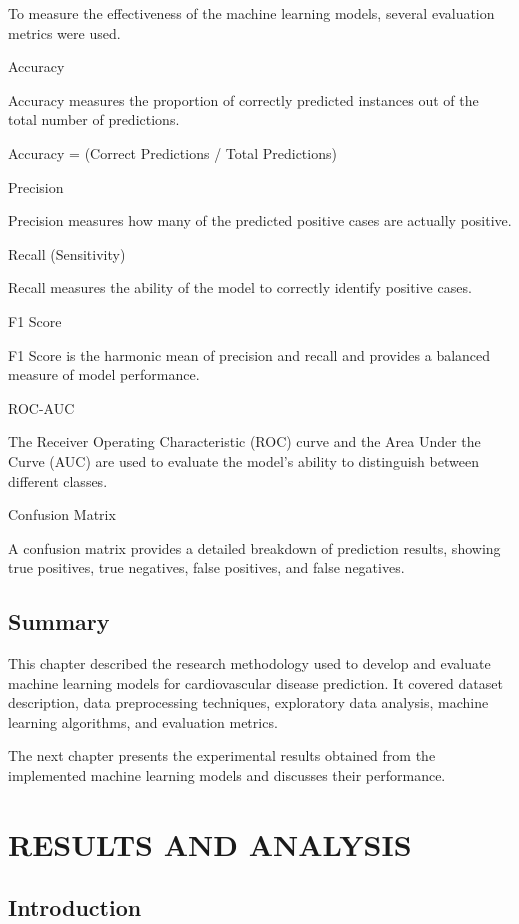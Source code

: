 To measure the effectiveness of the machine learning models, several evaluation metrics were used.

Accuracy

Accuracy measures the proportion of correctly predicted instances out of the total number of predictions.

Accuracy = (Correct Predictions / Total Predictions)

Precision

Precision measures how many of the predicted positive cases are actually positive.

Recall (Sensitivity)

Recall measures the ability of the model to correctly identify positive cases.

F1 Score

F1 Score is the harmonic mean of precision and recall and provides a balanced measure of model performance.

ROC-AUC

The Receiver Operating Characteristic (ROC) curve and the Area Under the Curve (AUC) are used to evaluate the model’s ability to distinguish between different classes.

Confusion Matrix

A confusion matrix provides a detailed breakdown of prediction results, showing true positives, true negatives, false positives, and false negatives.

\section{Summary}

This chapter described the research methodology used to develop and evaluate machine learning models for cardiovascular disease prediction. It covered dataset description, data preprocessing techniques, exploratory data analysis, machine learning algorithms, and evaluation metrics.

The next chapter presents the experimental results obtained from the implemented machine learning models and discusses their performance.

\chapter{RESULTS AND ANALYSIS}

\section{Introduction}

